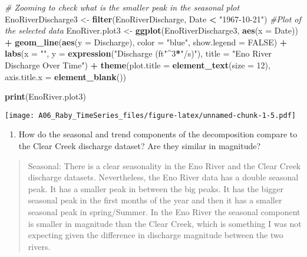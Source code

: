 \documentclass[]{article}
\newenvironment{Shaded}{\begin{snugshade}}{\end{snugshade}}
\newcommand{\CommentTok}[1]{\textcolor[rgb]{0.56,0.35,0.01}{\textit{#1}}}
\newcommand{\DataTypeTok}[1]{\textcolor[rgb]{0.13,0.29,0.53}{#1}}
\newcommand{\DecValTok}[1]{\textcolor[rgb]{0.00,0.00,0.81}{#1}}
\newcommand{\KeywordTok}[1]{\textcolor[rgb]{0.13,0.29,0.53}{\textbf{#1}}}
\newcommand{\NormalTok}[1]{#1}
\newcommand{\OperatorTok}[1]{\textcolor[rgb]{0.81,0.36,0.00}{\textbf{#1}}}
\newcommand{\OtherTok}[1]{\textcolor[rgb]{0.56,0.35,0.01}{#1}}
\newcommand{\StringTok}[1]{\textcolor[rgb]{0.31,0.60,0.02}{#1}}
\providecommand{\tightlist}{%
  \setlength{\itemsep}{0pt}\setlength{\parskip}{0pt}}
\begin{document}
\begin{Shaded}
\begin{Highlighting}[]
\CommentTok{# Zooming to check what is the smaller peak in the seasonal plot}
\NormalTok{EnoRiverDischarge3 <-}\StringTok{ }\KeywordTok{filter}\NormalTok{(EnoRiverDischarge, Date }\OperatorTok{<}\StringTok{ "1967-10-21"}\NormalTok{)}
\CommentTok{#Plot of the selected data}
\NormalTok{EnoRiver.plot3 <-}\StringTok{ }\KeywordTok{ggplot}\NormalTok{(EnoRiverDischarge3, }\KeywordTok{aes}\NormalTok{(}\DataTypeTok{x =}\NormalTok{ Date)) }\OperatorTok{+}
\StringTok{  }\KeywordTok{geom_line}\NormalTok{(}\KeywordTok{aes}\NormalTok{(}\DataTypeTok{y =}\NormalTok{ Discharge), }\DataTypeTok{color =} \StringTok{"blue"}\NormalTok{, }\DataTypeTok{show.legend =} \OtherTok{FALSE}\NormalTok{) }\OperatorTok{+}
\StringTok{  }\KeywordTok{labs}\NormalTok{(}\DataTypeTok{x =} \StringTok{""}\NormalTok{, }\DataTypeTok{y =} \KeywordTok{expression}\NormalTok{(}\StringTok{"Discharge (ft"}\OperatorTok{^}\DecValTok{3}\OperatorTok{*}\StringTok{"/s)"}\NormalTok{), }
       \DataTypeTok{title =} \StringTok{"Eno River Discharge Over Time"}\NormalTok{) }\OperatorTok{+}
\StringTok{  }\KeywordTok{theme}\NormalTok{(}\DataTypeTok{plot.title =} \KeywordTok{element_text}\NormalTok{(}\DataTypeTok{size =} \DecValTok{12}\NormalTok{),}
        \DataTypeTok{axis.title.x =} \KeywordTok{element_blank}\NormalTok{())}

\KeywordTok{print}\NormalTok{(EnoRiver.plot3)}
\end{Highlighting}
\end{Shaded}

\texttt{[image: A06\_Raby\_TimeSeries\_files/figure-latex/unnamed-chunk-1-5.pdf]}

\begin{enumerate}
\def\labelenumi{\arabic{enumi}.}
\setcounter{enumi}{9}
\tightlist
\item
  How do the seasonal and trend components of the decomposition compare
  to the Clear Creek discharge dataset? Are they similar in magnitude?
\end{enumerate}

\begin{quote}
Seasonal: There is a clear seasonality in the Eno River and the Clear
Creek discharge datasets. Nevertheless, the Eno River data has a double
seasonal peak. It has a smaller peak in between the big peaks. It has
the bigger seasonal peak in the first months of the year and then it has
a smaller seasonal peak in spring/Summer. In the Eno River the seasonal
component is smaller in magnitude than the Clear Creek, which is
something I was not expecting given the difference in discharge
magnitude between the two rivers.
\end{quote}
\end{document}
